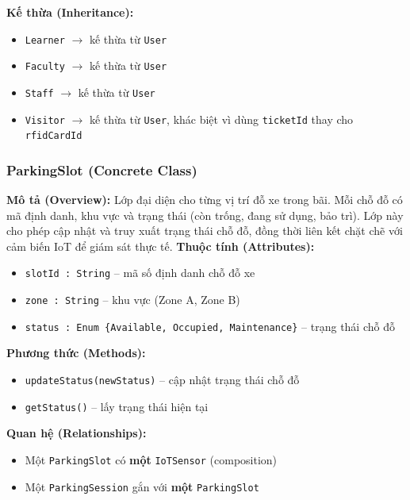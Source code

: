 \textbf{Kế thừa (Inheritance):}
\begin{itemize}[noitemsep]
  \item \texttt{Learner} $\rightarrow$ kế thừa từ \texttt{User}
  \item \texttt{Faculty} $\rightarrow$ kế thừa từ \texttt{User}
  \item \texttt{Staff} $\rightarrow$ kế thừa từ \texttt{User}
  \item \texttt{Visitor} $\rightarrow$ kế thừa từ \texttt{User}, khác biệt vì dùng \texttt{ticketId} thay cho \texttt{rfidCardId}
\end{itemize}

\subsubsection{ParkingSlot (Concrete Class)}
\textbf{Mô tả (Overview):} Lớp đại diện cho từng vị trí đỗ xe trong bãi. Mỗi chỗ đỗ có mã định danh, khu vực và trạng thái (còn trống, đang sử dụng, bảo trì). Lớp này cho phép cập nhật và truy xuất trạng thái chỗ đỗ, đồng thời liên kết chặt chẽ với cảm biến IoT để giám sát thực tế.
\textbf{Thuộc tính (Attributes):}
\begin{itemize}[noitemsep]
  \item \texttt{slotId : String} -- mã số định danh chỗ đỗ xe
  \item \texttt{zone : String} -- khu vực (Zone A, Zone B)
  \item \texttt{status : Enum \{Available, Occupied, Maintenance\}} -- trạng thái chỗ đỗ
\end{itemize}

\textbf{Phương thức (Methods):}
\begin{itemize}[noitemsep]
  \item \texttt{updateStatus(newStatus)} -- cập nhật trạng thái chỗ đỗ
  \item \texttt{getStatus()} -- lấy trạng thái hiện tại
\end{itemize}

\textbf{Quan hệ (Relationships):}
\begin{itemize}[noitemsep]
  \item Một \texttt{ParkingSlot} có \textbf{một} \texttt{IoTSensor} (composition)
  \item Một \texttt{ParkingSession} gắn với \textbf{một} \texttt{ParkingSlot}
\end{itemize}